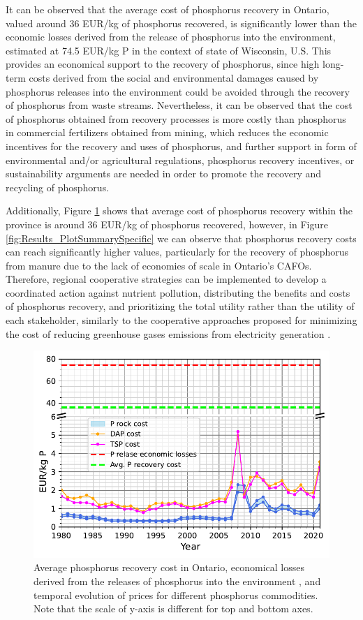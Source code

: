 \documentclass[authoryear]{elsarticle}
\begin{document}
It can be observed that the average cost of phosphorus recovery in Ontario, valued around 36 EUR/kg of phosphorus recovered, is significantly lower than the economic losses derived from the release of phosphorus into the environment, estimated at 74.5 EUR/kg P in the context of state of Wisconsin, U.S. This provides an economical support to the recovery of phosphorus, since high long-term costs derived from the social and environmental damages caused by phosphorus releases into the environment could be avoided through the recovery of phosphorus from waste streams. Nevertheless, it can be observed that the cost of phosphorus obtained from recovery processes is more costly than phosphorus in commercial fertilizers obtained from mining, which reduces the economic incentives for the recovery and uses of phosphorus, and further support in form of environmental and/or agricultural regulations, phosphorus recovery incentives, or sustainability arguments are needed in order to promote the recovery and recycling of phosphorus.

Additionally, Figure \ref{fig:CommodityPrices} shows that average cost of phosphorus recovery within the province is around 36 EUR/kg of phosphorus recovered, however, in Figure \ref{fig:Results_PlotSummarySpecific} we can observe that phosphorus recovery costs can reach significantly higher values, particularly for the recovery of phosphorus from manure due to the lack of economies of scale in Ontario's CAFOs. Therefore, regional cooperative strategies can be implemented to develop a coordinated action against nutrient pollution, distributing the benefits and costs of phosphorus recovery, and prioritizing the total utility rather than the utility of each stakeholder, similarly to the cooperative approaches proposed for minimizing the cost of reducing greenhouse gases emissions from electricity generation \citep{galan2018time}.

\begin{figure}[H]
	\centering
	\includegraphics[width=0.65\linewidth, trim={0cm 0cm 0cm 0cm},clip]{Figures/CommodityPrices.pdf} 
	\caption{Average phosphorus recovery cost in Ontario, economical losses derived from the releases of phosphorus into the environment \protect\citep{sampat2021valuing}, and temporal evolution of prices for different phosphorus commodities. Note that the scale of y-axis is different for top and bottom axes.}
	\label{fig:CommodityPrices}
\end{figure}
\end{document}
